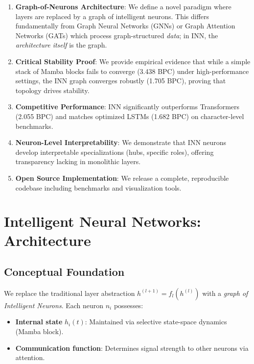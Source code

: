 \documentclass{article}
\begin{document}
\begin{enumerate}
    \item \textbf{Graph-of-Neurons Architecture}: We define a novel paradigm where layers are replaced by a graph of intelligent neurons. This differs fundamentally from Graph Neural Networks (GNNs) \cite{scarselli2008graph, kipf2016semi} or Graph Attention Networks (GATs) \cite{velickovic2018graph} which process graph-structured \emph{data}; in INN, the \emph{architecture itself} is the graph.
    \item \textbf{Critical Stability Proof}: We provide empirical evidence that while a simple stack of Mamba blocks fails to converge (3.438 BPC) under high-performance settings, the INN graph converges robustly (1.705 BPC), proving that topology drives stability.
    \item \textbf{Competitive Performance}: INN significantly outperforms Transformers \cite{vaswani2017attention} (2.055 BPC) and matches optimized LSTMs \cite{hochreiter1997long} (1.682 BPC) on character-level benchmarks.
    \item \textbf{Neuron-Level Interpretability}: We demonstrate that INN neurons develop interpretable specializations (hubs, specific roles), offering transparency lacking in monolithic layers.
    \item \textbf{Open Source Implementation}: We release a complete, reproducible codebase including benchmarks and visualization tools.
\end{enumerate}

\section{Intelligent Neural Networks: Architecture}

\subsection{Conceptual Foundation}

We replace the traditional layer abstraction $h^{(l+1)} = f_l(h^{(l)})$ with a \emph{graph of Intelligent Neurons}. Each neuron $n_i$ possesses:
\begin{itemize}
    \item \textbf{Internal state} $h_i(t)$: Maintained via selective state-space dynamics (Mamba block).
    \item \textbf{Communication function}: Determines signal strength to other neurons via attention.
\end{itemize}
\end{document}
